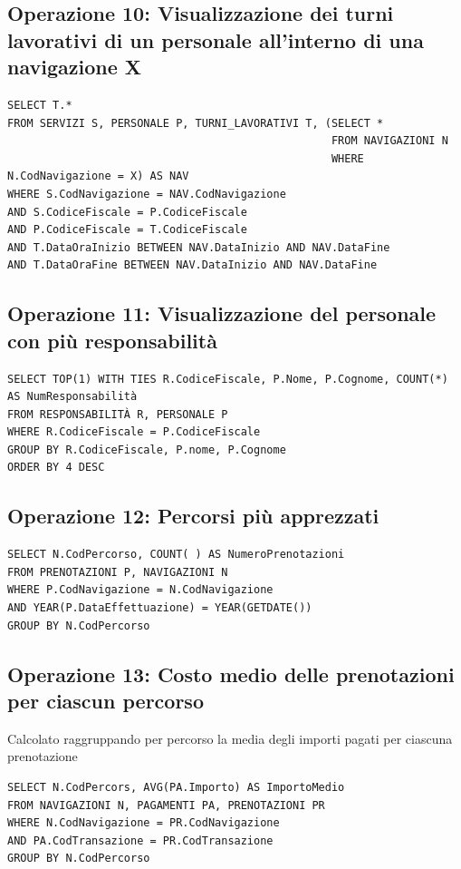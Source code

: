 \documentclass[a4paper, titlepage]{report}
\begin{document}
\vspace{0.5cm}
\subsection*{Operazione 10: Visualizzazione dei turni lavorativi di un personale all'interno di una navigazione X}
\begin{lstlisting}
SELECT T.*
FROM SERVIZI S, PERSONALE P, TURNI_LAVORATIVI T, (SELECT * 
                                                  FROM NAVIGAZIONI N 
                                                  WHERE N.CodNavigazione = X) AS NAV
WHERE S.CodNavigazione = NAV.CodNavigazione
AND S.CodiceFiscale = P.CodiceFiscale
AND P.CodiceFiscale = T.CodiceFiscale
AND T.DataOraInizio BETWEEN NAV.DataInizio AND NAV.DataFine
AND T.DataOraFine BETWEEN NAV.DataInizio AND NAV.DataFine
\end{lstlisting}

\vspace{0.5cm}
\subsection*{Operazione 11: Visualizzazione del personale con più responsabilità}
\begin{lstlisting}
SELECT TOP(1) WITH TIES R.CodiceFiscale, P.Nome, P.Cognome, COUNT(*) AS NumResponsabilità
FROM RESPONSABILITÀ R, PERSONALE P
WHERE R.CodiceFiscale = P.CodiceFiscale
GROUP BY R.CodiceFiscale, P.nome, P.Cognome
ORDER BY 4 DESC
\end{lstlisting}

\vspace{0.5cm}
\subsection*{Operazione 12: Percorsi più apprezzati}
\begin{lstlisting}
SELECT N.CodPercorso, COUNT( ) AS NumeroPrenotazioni
FROM PRENOTAZIONI P, NAVIGAZIONI N
WHERE P.CodNavigazione = N.CodNavigazione
AND YEAR(P.DataEffettuazione) = YEAR(GETDATE())
GROUP BY N.CodPercorso
\end{lstlisting}

\vspace{0.5cm}
\subsection*{Operazione 13: Costo medio delle prenotazioni per ciascun percorso}
Calcolato raggruppando per percorso la media degli importi pagati per ciascuna prenotazione
\begin{lstlisting}[]
SELECT N.CodPercors, AVG(PA.Importo) AS ImportoMedio
FROM NAVIGAZIONI N, PAGAMENTI PA, PRENOTAZIONI PR
WHERE N.CodNavigazione = PR.CodNavigazione
AND PA.CodTransazione = PR.CodTransazione
GROUP BY N.CodPercorso
\end{lstlisting}
\end{document}
